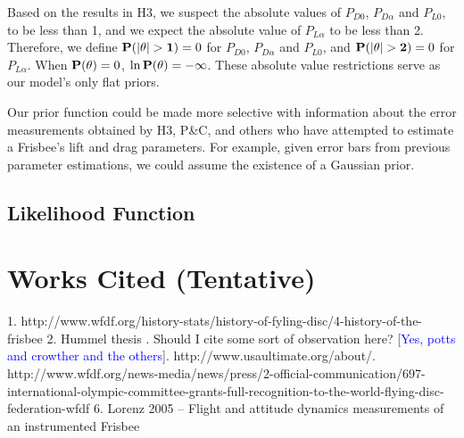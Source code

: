 \documentclass[a4paper,12pt, oneside]{article}
\newcommand{\blue}[1]{\textcolor{blue}{#1}}
\begin{document}
Based on the results in H3, we suspect the absolute values of $P_{D0}$, $P_{D\alpha}$ and $P_{L0}$, to be less than 1, and we expect the absolute value of $P_{L\alpha}$ to be less than 2. Therefore, we define $\bold{P(\left|\theta\right|>1)}=0$ for $P_{D0}$, $P_{D\alpha}$ and $P_{L0}$, and $\bold{P(\left|\theta\right|>2)}=0$ for $P_{L\alpha}$. When  $\bold{P(\theta)}=0$, $\ln\bold{P(\theta)}=-\infty$. These absolute value restrictions serve as our model's only flat priors.

Our prior function could be made more selective with information about the error measurements obtained by H3, P\&C, and others who have attempted to estimate a Frisbee's lift and drag parameters. For example, given error bars from previous parameter estimations, we could assume the existence of a Gaussian prior. 
\subsection{Likelihood Function}

\color{black}
\section{Works Cited (Tentative)}

1. http://www.wfdf.org/history-stats/history-of-fyling-disc/4-history-of-the-frisbee
2. Hummel thesis . Should I cite some sort of observation here? [\blue{Yes, potts and crowther and the others}]. http://www.usaultimate.org/about/. http://www.wfdf.org/news-media/news/press/2-official-communication/697-international-olympic-committee-grants-full-recognition-to-the-world-flying-disc-federation-wfdf
6. Lorenz 2005 -- Flight and attitude dynamics measurements of an instrumented Frisbee 
\end{document}
